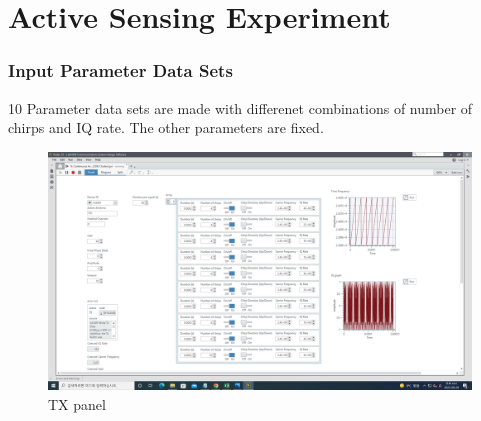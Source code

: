 \section{Active Sensing Experiment}
    \subsubsection*{Input Parameter Data Sets}
    10 Parameter data sets are made with differenet combinations of number of chirps and IQ rate. The other parameters are fixed. \\
    \vspace{-4mm}  
    \begin{figure}[!h]\raggedleft
    \hspace{15mm}
		\includegraphics[width=.95\textwidth]{image/week04/1-1-b.png}
		\caption{\footnotesize TX panel}
		\vspace{-10pt}
    \end{figure}
    
